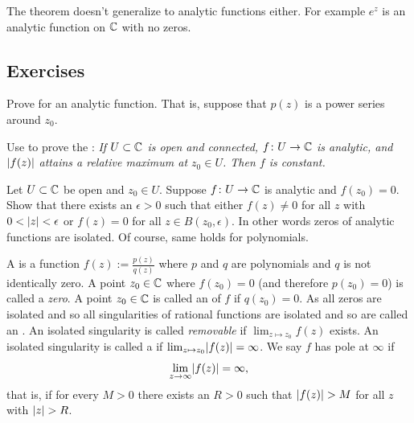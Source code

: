 The theorem doesn't generalize to analytic functions either.  For example
$e^{z}$ is an analytic function on ${\mathbb{C}}$ with no zeros.

\subsection{Exercises}

\begin{exercise} \label{exercise:minprinciple}
Prove  for an analytic function.  That
is, suppose that $p(z)$ is a power series around $z_0$.
\end{exercise}

\begin{exercise}
Use  to prove the \emph{}: \emph{If $U \subset {\mathbb{C}}$ is open and connected,
$f \colon U \to {\mathbb{C}}$ is analytic, and $\lvert {f(z)} \rvert$ attains a relative
maximum at $z_0 \in U$.  Then $f$ is constant.}
\end{exercise}

\begin{exercise}
Let $U \subset {\mathbb{C}}$ be open and $z_0 \in U$.
Suppose $f \colon U \to {\mathbb{C}}$ is analytic and $f(z_0) = 0$.  Show that
there exists an $\epsilon > 0$ such that either
$f(z) \not= 0$ for all $z$ with $0 < \lvert {z} \rvert < \epsilon$
or $f(z) = 0$ for all $z \in B(z_0,\epsilon)$.
In other words zeros of analytic functions are isolated.
Of course, same holds for polynomials.
\end{exercise}

\pagebreak[1]
\begin{exnote}
A \emph{} is a function
$f(z) := \frac{p(z)}{q(z)}$
where $p$ and $q$ are polynomials and $q$ is not identically zero.
A point $z_0 \in {\mathbb{C}}$ where $f(z_0) = 0$ (and therefore $p(z_0) = 0$)
is called a \emph{zero}.
A point $z_0 \in {\mathbb{C}}$ is called an \emph{} of
$f$ if $q(z_0) = 0$.  As all zeros are isolated and so
all singularities of rational functions are isolated
and so are called
an \emph{}.
An isolated singularity is called
\emph{removable}
if $\lim_{z \mapsto z_0} f(z)$ exists.
An isolated singularity is called a \emph{} if 
$\lim_{z \mapsto z_0} \lvert {f(z)} \rvert = \infty$.
We say $f$ has pole at $\infty$ if
\begin{equation*}
\lim_{z \to \infty} \lvert {f(z)} \rvert = \infty ,
\end{equation*}
that is, if for every $M > 0$ there exists an $R > 0$ such that
$\lvert {f(z)} \rvert > M$ for all $z$ with $\lvert {z} \rvert > R$.
\end{exnote}

